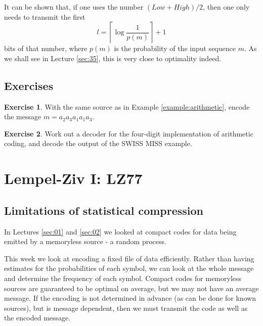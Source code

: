 \documentclass[a4paper, 11pt, openany]{book}
\numberwithin{equation}{section}
\theoremstyle{plain}
\theoremstyle{definition}
\newtheorem{exercise}   {Exercise}  [section]
\begin{document}
It can be shown that, if one uses the number $(Low + High)/2$, then one only needs to transmit the first
\[
    l = \left\lceil \log \frac{1}{p(m)} \right\rceil + 1
\]
bits of that number, where $p(m)$ is the probability of the input sequence $m$. As we shall see in Lecture \ref{sec:35}, this is very close to optimality indeed.


\subsection{Exercises}

\begin{exercise} \label{exercise:arithmetic}
With the same source as in Example \ref{example:arithmetic}, encode the message $m = a_2a_3a_1a_1a_3$.
\end{exercise}



\begin{exercise} \label{exercise:swiss_miss}
Work out a decoder for the four-digit implementation of arithmetic coding, and decode the output of the SWISS MISS example.
\end{exercise}



\section{Lempel-Ziv I: LZ77}
\label{sec:03}


\subsection{Limitations of statistical compression}

In Lectures \ref{sec:01} and \ref{sec:02} we looked at compact codes for data being emitted by a memoryless source - a random process.

This week we look at encoding a fixed file of data efficiently. Rather than having estimates for the probabilities of each symbol, we can look at the whole message and determine the frequency of each symbol. Compact codes for memoryless sources are guaranteed to be optimal on average, but we may not have an average message. If the encoding is not determined in advance (as can be done for known sources), but is message dependent, then we must transmit the code as well as the encoded message.
\end{document}
